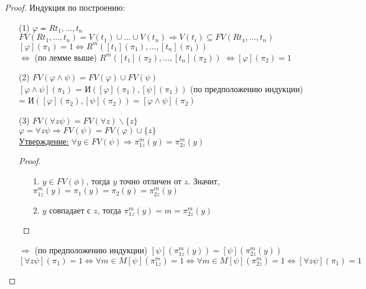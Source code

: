 \documentclass[a4paper, fleqn]{article}
\begin{document}
    \begin{proof}
        Индукция по построению: 
        \begin{itemize}
            \item[(1)] $\varphi \eqcirc Rt_1, \ldots, t_n$\\
            $FV(Rt_1, \ldots, t_n) = V(t_1) ∪ \ldots  ∪ V(t_n) ⇒
            V(t_i) ⊆ FV(Rt_1, \ldots, t_n)$  \\
            $[\varphi](\pi_1) = 1 ⇔ R^m([t_1](\pi_1), \ldots, [t_n](\pi_1))$
             \\
            $⇔$ (по лемме выше) $R^m([t_1](\pi_2), \ldots, [t_n](\pi_2))$
            $⇔ [\varphi](\pi_2) = 1$
            \item[(2)] 
            $FV(\varphi  ∧ \psi) = FV(\varphi) ∪ FV(\psi)$ \\
            $[\varphi  ∧ \psi](\pi_1)$ = И$([\varphi](\pi_1), [\psi](\pi_1)) 
            $ (по предположению индукции) = И$([\varphi](\pi_2), [\psi](\pi_2))
            = [\varphi  ∧ \psi](\pi_2)$
            \item[(3)]
            $FV(∀ z \psi) = FV(∀z) \backslash \{z\}$ \\  
            $\varphi=∀ z \psi ⇒ FV(\psi) = FV(\varphi) ∪ \{z\}$  \\

            \underline{Утверждение:} $∀ y ∈ FV(\psi) ⇒ \pi_{1 z}^m(y) = \pi_{2 z}^m(y)$
            \begin{proof} \ \\
                \begin{itemize} 
                    \item[1.] $y ∈ FV(\phi)$, тогда $y$ точно отличен от $z$. Значит,
                     $\pi_{1 z}^m(y) = \pi_1(y) = \pi_2(y) = \pi_{2 z}^m(y)$
                     \item[2.] $y$ совпадает с $z$, тогда
                     $\pi_{1 z}^m(y) = m = \pi_{2 z}^m(y)$  
                \end{itemize}   
            \end{proof}
            $⇒$ (по предположению индукции) 
            $[\psi](\pi_{1 z}^m(y)) = [\psi](\pi_{2 z}^m(y))$ \\[9.5pt]
            $[∀ z \psi](\pi_1) = 1 ⇔ ∀ m ∈ M [\psi](\pi_{1 z}^m) = 1
            ⇔ ∀ m ∈ M [\psi](\pi_{2 z}^m) = 1 ⇔ [∀ z \psi](\pi_1) = 1$
        \end{itemize}
    \end{proof}
\end{document}
